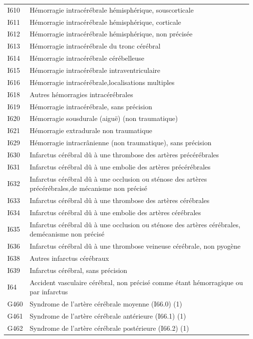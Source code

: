 \documentclass[12pt,english,french,twoside]{report}\usepackage[]{graphicx}\usepackage[]{color}
\begin{document}
\begin{longtable}{|l|l|}
 I610 & Hémorragie intracérébrale hémisphérique, souscorticale \\
 I611 & Hémorragie intracérébrale hémisphérique, corticale \\
 I612 & Hémorragie intracérébrale hémisphérique, non précisée \\
 I613 & Hémorragie intracérébrale du tronc cérébral \\
 I614 & Hémorragie intracérébrale cérébelleuse \\
 I615 & Hémorragie intracérébrale intraventriculaire \\
 I616 & Hémorragie intracérébrale,localisations multiples \\
 I618 & Autres hémorragies intracérébrales \\
 I619 & Hémorragie intracérébrale, sans précision \\
 I620 & Hémorragie sousdurale (aiguë) (non traumatique) \\
 I621 & Hémorragie extradurale non traumatique \\
 I629 & Hémorragie intracrânienne (non traumatique), sans précision \\
 I630 & Infarctus cérébral dû à une thrombose des artères précérébrales \\
 I631 & Infarctus cérébral dû à une embolie des artères précérébrales \\
 I632 & Infarctus cérébral dû à une occlusion ou sténose des artères précérébrales,de mécanisme non précisé \\
 I633 & Infarctus cérébral dû à une thrombose des artères cérébrales \\
 I634 & Infarctus cérébral dû à une embolie des artères cérébrales \\
 I635 & Infarctus cérébral dû à une occlusion ou sténose des artères cérébrales, demécanisme non précisé \\
 I636 & Infarctus cérébral dû à une thrombose veineuse cérébrale, non pyogène \\
 I638 & Autres infarctus cérébraux \\
 I639 & Infarctus cérébral, sans précision \\
 I64 & Accident vasculaire cérébral, non précisé comme étant hémorragique ou par infarctus \\
 G460 & Syndrome de l'artère cérébrale moyenne (I66.0) (1) \\
 G461 & Syndrome de l'artère cérébrale antérieure (I66.1) (1) \\
 G462 & Syndrome de l'artère cérébrale postérieure (I66.2) (1) \\

\end{longtable}
\end{document}
